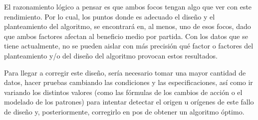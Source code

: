 El razonamiento lógico a pensar es que ambos focos tengan algo que ver con este rendimiento. Por lo cual, los puntos donde es adecuado el diseño y el planteamiento del algoritmo, se encontrará en, al menos, uno de esos focos, dado que ambos factores afectan al beneficio medio por partida.
Con los datos que se tiene actualmente, no se pueden aislar con más precisión qué factor o factores del planteamiento y/o del diseño del algoritmo provocan estos resultados.

 Para llegar a corregir este diseño, sería necesario tomar una mayor cantidad de datos, hacer pruebas cambiando las condiciones y las especificaciones, así como ir variando los distintos valores (como las fórmulas de los cambios de acción o el modelado de los patrones) para intentar detectar el origen u orígenes de este fallo de diseño y, posteriormente, corregirlo en pos de obtener un algoritmo óptimo.